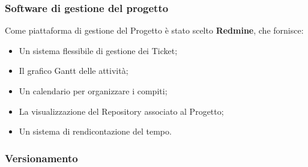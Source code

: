 \subsubsection{Software di gestione del progetto} 
\label{subsec:Software di gestione del prodotto}
Come piattaforma di gestione del Progetto è stato scelto \textbf{Redmine}, che fornisce:
\begin{itemize}
\item Un sistema flessibile di gestione dei Ticket;
\item Il grafico Gantt delle attività;
\item Un calendario per organizzare i compiti;
\item La visualizzazione del Repository associato al Progetto;
\item Un sistema di rendicontazione del tempo.
\end{itemize}


\subsubsection{Versionamento}


